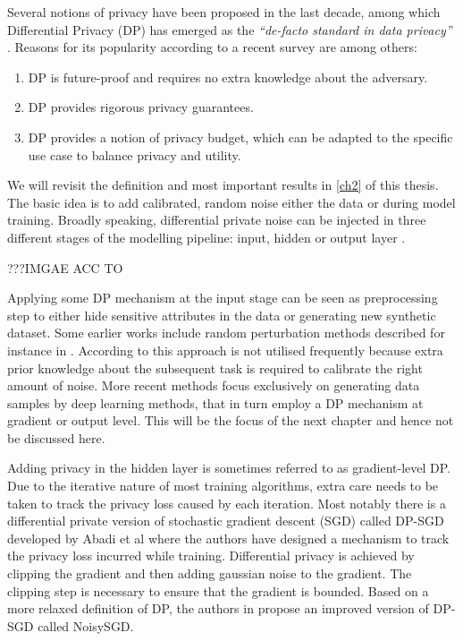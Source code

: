 Several notions of privacy have been proposed in the last decade, among which Differential Privacy (DP) has emerged as the \textit{``de-facto standard in data privacy''} \parencite{kim2021survey}. Reasons for its popularity according to a recent survey \parencite{surv_dp2021} are among others:

\begin{enumerate}
    \item DP is future-proof and requires no extra knowledge about the adversary.
    \item DP provides rigorous privacy guarantees.
    \item DP provides a notion of privacy budget, which can be adapted to the specific use case to balance privacy and utility.
\end{enumerate}

We will revisit the definition and most important results in \cref{ch2} of this thesis. The basic idea is to add calibrated, random noise either the data or during model training. Broadly speaking, differential private noise can be injected in three different stages of the modelling pipeline: input, hidden or output layer \parencite[cf.][]{zhao2019differential}. 

???IMGAE ACC TO \parencite{wang2023differential}

Applying some DP mechanism at the input stage can be seen as preprocessing step to either hide sensitive attributes in the data or generating new synthetic dataset. Some earlier works include random perturbation methods described for instance in \parencite{input_levelDP,erm_dp_input}. According to \parencite{wang2023differential} this approach is not utilised frequently because extra prior knowledge about the subsequent task is required to calibrate the right amount of noise. More recent methods focus exclusively on generating data samples by deep learning methods, that in turn employ a DP mechanism at gradient or output level. This will be the focus of the next chapter and hence not be discussed here.

Adding privacy in the hidden layer is sometimes referred to as gradient-level DP. Due to the iterative nature of most training algorithms, extra care needs to be taken to track the privacy loss caused by each iteration. Most notably there is a differential private version of stochastic gradient descent (SGD) called DP-SGD developed by Abadi et al \parencite{Abadi_2016} where the authors have designed a mechanism to track the privacy loss incurred while training. Differential privacy is achieved by clipping the gradient and then adding gaussian noise to the gradient. The clipping step is necessary to ensure that the gradient is bounded. Based on a more relaxed definition of DP, the authors in \parencite{bu2020deep} propose an improved version of DP-SGD called NoisySGD. 

